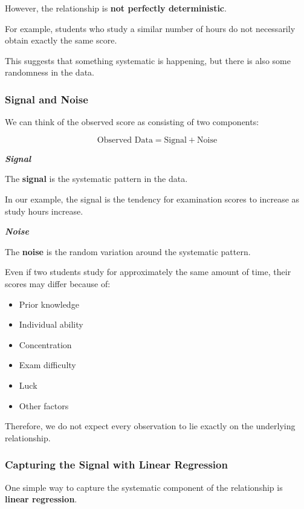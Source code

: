 \documentclass[
  a4paper,
]{article}
\providecommand{\tightlist}{%
  \setlength{\itemsep}{0pt}\setlength{\parskip}{0pt}}
\begin{document}
However, the relationship is \textbf{not perfectly deterministic}.

For example, students who study a similar number of hours do not
necessarily obtain exactly the same score.

This suggests that something systematic is happening, but there is also
some randomness in the data.

\subsubsection{Signal and Noise}\label{signal-and-noise}

We can think of the observed score as consisting of two components:

\[
\boxed{\text{Observed Data} = \text{Signal} + \text{Noise}}
\]

\textbf{\emph{Signal}}

The \textbf{signal} is the systematic pattern in the data.

In our example, the signal is the tendency for examination scores to
increase as study hours increase.

\textbf{\emph{Noise}}

The \textbf{noise} is the random variation around the systematic
pattern.

Even if two students study for approximately the same amount of time,
their scores may differ because of:

\begin{itemize}
\tightlist
\item
  Prior knowledge
\item
  Individual ability
\item
  Concentration
\item
  Exam difficulty
\item
  Luck
\item
  Other factors
\end{itemize}

Therefore, we do not expect every observation to lie exactly on the
underlying relationship.

\subsubsection{Capturing the Signal with Linear
Regression}\label{capturing-the-signal-with-linear-regression}

One simple way to capture the systematic component of the relationship
is \textbf{linear regression}.
\end{document}
